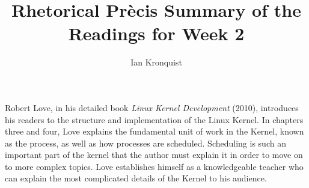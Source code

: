 \documentclass[12pt,letterpaper]{article}
\begin{document}
\title{Rhetorical Pr\`{e}cis Summary of the Readings for Week 2}
\author{Ian Kronquist}
\maketitle

\vspace{2cm}

Robert Love, in his detailed book \textit{Linux Kernel Development} (2010), introduces his readers to the structure and implementation of the Linux Kernel.
In chapters three and four, Love explains the fundamental unit of work in the Kernel, known as the process, as well as how processes are scheduled.
Scheduling is such an important part of the kernel that the author must explain it  in order to move on to more complex topics.
Love establishes himself as a knowledgeable teacher who can explain the most complicated details of the Kernel to his audience.
\end{document}
